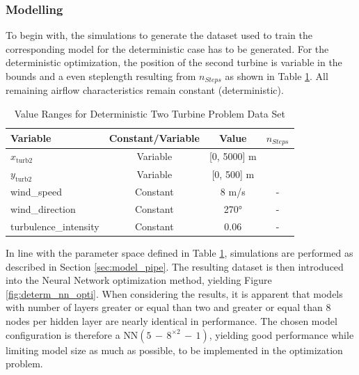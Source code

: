 \subsubsection{Modelling}

To begin with, the simulations to generate the dataset used to train the corresponding model for the deterministic case has to be generated. For the deterministic optimization, the position of the second turbine is variable in the bounds and a even steplength resulting from $n_{Steps}$ as shown in Table \ref{tab:val_determ_data}. All remaining airflow characteristics remain constant (deterministic).

\begin{table}[ht]
	\centering
	\caption{Value Ranges for Deterministic Two Turbine Problem Data Set}
	\begin{tabular}{|l|c|c|c|}
		\hline
		\textbf{Variable} & \textbf{Constant/Variable} & \textbf{Value} & \textbf{$n_{Steps}$}\\
		\hline
		$x_{\text{turb2}}$ & Variable & [0, 5000] m &\\
		$y_{\text{turb2}}$ & Variable & [0, 500] m &\\
		wind\_speed & Constant & 8 m/s & -\\
		wind\_direction & Constant & 270°&- \\
		turbulence\_intensity & Constant & 0.06 & - \\
		\hline
	\end{tabular}

	\label{tab:val_determ_data}
\end{table}

In line with the parameter space defined in Table \ref{tab:val_determ_data}, simulations are performed as described in Section \ref{sec:model_pipe}. The resulting dataset is then introduced into the Neural Network optimization method, yielding Figure \ref{fig:determ_nn_opti}. When considering the results, it is apparent that models with number of layers greater or equal than two and greater or equal than 8 nodes per hidden layer are nearly identical in performance. The chosen model configuration is therefore a $\text{NN}(5\,{-}\,8^{\times2}\,{-}\,1)$, yielding good performance while limiting model size as much as possible, to be implemented in the optimization problem. 

